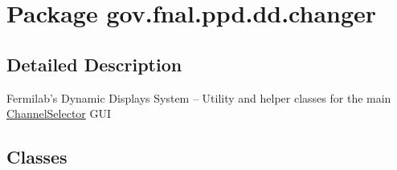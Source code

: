 \hypertarget{namespacegov_1_1fnal_1_1ppd_1_1dd_1_1changer}{\section{Package gov.\-fnal.\-ppd.\-dd.\-changer}
\label{namespacegov_1_1fnal_1_1ppd_1_1dd_1_1changer}
}


\subsection{Detailed Description}
Fermilab's Dynamic Displays System -- Utility and helper classes for the main \hyperlink{classgov_1_1fnal_1_1ppd_1_1dd_1_1ChannelSelector}{Channel\-Selector} G\-U\-I\subsection*{Classes}
